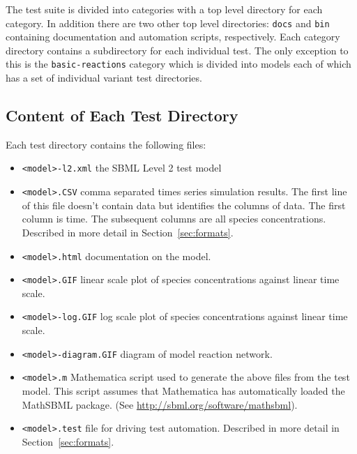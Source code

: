 \documentclass{cekarticle}
\begin{document}
The test suite is divided into categories with a top level
directory for each category.  In addition there are two other top
level directories: \texttt{docs} and \texttt{bin}
containing documentation and automation scripts, respectively. Each
category directory contains a subdirectory for each individual
test.  The only exception to this is the \texttt{basic-reactions}
category which is divided into models each of which has a set of
individual variant test directories.

\subsection{Content of Each Test Directory}
\label{sec:test-directory}

Each test directory contains the following files:

\begin{itemize}

\item \texttt{<model>-l2.xml} the SBML Level 2 test model

\item \texttt{<model>.CSV} comma separated times series simulation
results.  The first line of this file doesn't contain data but
identifies the columns of data.  The first column is time.  The
subsequent columns are all species concentrations.  Described in
more detail in Section~\ref{sec:formats}.

\item \texttt{<model>.html} documentation on the model.

\item \texttt{<model>.GIF} linear scale plot of species
concentrations against linear time scale.

\item \texttt{<model>-log.GIF} log scale plot of species
concentrations against linear time scale.

\item \texttt{<model>-diagram.GIF} diagram of model reaction
network.

\item \texttt{<model>.m} Mathematica script used to generate the
above files from the test model.  This script assumes that
Mathematica has automatically loaded the MathSBML package.  (See
\url{http://sbml.org/software/mathsbml}).

\item \texttt{<model>.test} file for driving test automation.
Described in more detail in Section~\ref{sec:formats}.

\end{itemize}
\end{document}
